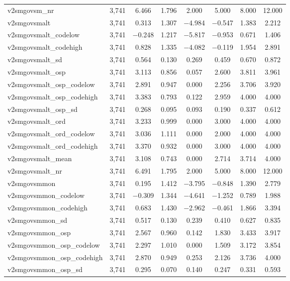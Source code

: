 \begin{table}[!htbp]
\begin{tabular}{@{\extracolsep{5pt}}lccccccc}
v2smgovsm\_nr & 3,741 & 6.466 & 1.796 & 2.000 & 5.000 & 8.000 & 12.000 \\ 
v2smgovsmalt & 3,741 & 0.313 & 1.307 & $-$4.984 & $-$0.547 & 1.383 & 2.212 \\ 
v2smgovsmalt\_codelow & 3,741 & $-$0.248 & 1.217 & $-$5.817 & $-$0.953 & 0.671 & 1.406 \\ 
v2smgovsmalt\_codehigh & 3,741 & 0.828 & 1.335 & $-$4.082 & $-$0.119 & 1.954 & 2.891 \\ 
v2smgovsmalt\_sd & 3,741 & 0.564 & 0.130 & 0.269 & 0.459 & 0.670 & 0.872 \\ 
v2smgovsmalt\_osp & 3,741 & 3.113 & 0.856 & 0.057 & 2.600 & 3.811 & 3.961 \\ 
v2smgovsmalt\_osp\_codelow & 3,741 & 2.891 & 0.947 & 0.000 & 2.256 & 3.706 & 3.920 \\ 
v2smgovsmalt\_osp\_codehigh & 3,741 & 3.383 & 0.793 & 0.122 & 2.959 & 4.000 & 4.000 \\ 
v2smgovsmalt\_osp\_sd & 3,741 & 0.268 & 0.095 & 0.093 & 0.190 & 0.337 & 0.612 \\ 
v2smgovsmalt\_ord & 3,741 & 3.233 & 0.999 & 0.000 & 3.000 & 4.000 & 4.000 \\ 
v2smgovsmalt\_ord\_codelow & 3,741 & 3.036 & 1.111 & 0.000 & 2.000 & 4.000 & 4.000 \\ 
v2smgovsmalt\_ord\_codehigh & 3,741 & 3.370 & 0.932 & 0.000 & 3.000 & 4.000 & 4.000 \\ 
v2smgovsmalt\_mean & 3,741 & 3.108 & 0.743 & 0.000 & 2.714 & 3.714 & 4.000 \\ 
v2smgovsmalt\_nr & 3,741 & 6.491 & 1.795 & 2.000 & 5.000 & 8.000 & 12.000 \\ 
v2smgovsmmon & 3,741 & 0.195 & 1.412 & $-$3.795 & $-$0.848 & 1.390 & 2.779 \\ 
v2smgovsmmon\_codelow & 3,741 & $-$0.309 & 1.344 & $-$4.641 & $-$1.252 & 0.789 & 1.988 \\ 
v2smgovsmmon\_codehigh & 3,741 & 0.683 & 1.430 & $-$2.962 & $-$0.461 & 1.866 & 3.394 \\ 
v2smgovsmmon\_sd & 3,741 & 0.517 & 0.130 & 0.239 & 0.410 & 0.627 & 0.835 \\ 
v2smgovsmmon\_osp & 3,741 & 2.567 & 0.960 & 0.142 & 1.830 & 3.433 & 3.917 \\ 
v2smgovsmmon\_osp\_codelow & 3,741 & 2.297 & 1.010 & 0.000 & 1.509 & 3.172 & 3.854 \\ 
v2smgovsmmon\_osp\_codehigh & 3,741 & 2.870 & 0.949 & 0.253 & 2.126 & 3.736 & 4.000 \\ 
v2smgovsmmon\_osp\_sd & 3,741 & 0.295 & 0.070 & 0.140 & 0.247 & 0.331 & 0.593 \\ 

\end{tabular}
\end{table}
